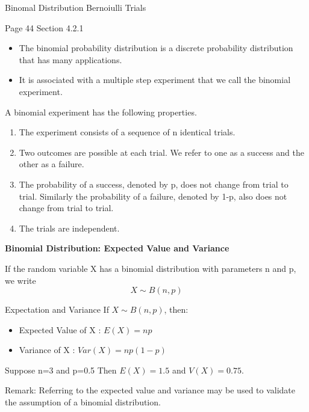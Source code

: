 \documentclass[12pt, a4paper]{report}
\author{ } \date{ }
\theoremstyle{definition}
\theoremstyle{remark}
\begin{document}
	Binomal Distribution
	Bernoiulli Trials
	
	Page 44
	Section 4.2.1 
	
	\begin{itemize}
		\item The binomial probability distribution is a discrete probability distribution that has many applications.
		\item It is associated with a multiple step experiment that we call the binomial experiment.
	\end{itemize}
	
	A binomial experiment has the following properties.
	
	\begin{enumerate}
		\item The experiment consists of a sequence of n identical trials.
		
		\item Two outcomes are possible at each trial. We refer to one as a success and the other as a failure.
		
		\item The probability of a success, denoted by p, does not change from trial to trial. Similarly the probability of a failure, denoted by 1-p, also does not change from trial to trial.
		
		\item The trials are independent.
	\end{enumerate}
	

	\textbf{Binomial Distribution: Expected Value and Variance}
	
	
	If the random variable X has a binomial distribution with parameters n
	and p, we write
	\[ X \sim B(n,p) \]
	
	Expectation and Variance
	If $X \sim B(n,p)$, then:
	
	\begin{itemize}
		\item Expected Value of X : $E(X) = np$
		\item Variance of X : $Var(X) = np(1-p)$
	\end{itemize}
	
	Suppose n=3 and p=0.5 
	Then $E(X) = 1.5$ and $V(X) = 0.75$.
	
	Remark: Referring to the expected value and variance may be used to validate
	the assumption of a binomial distribution.


	
	
\end{document}
